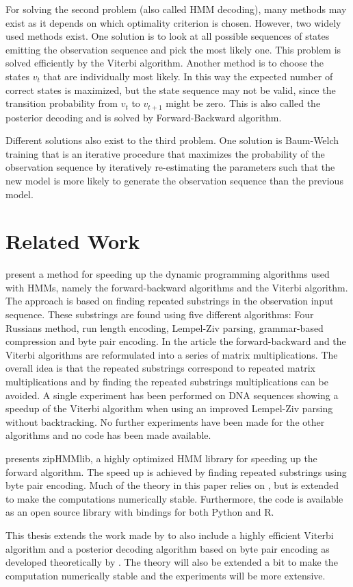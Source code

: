 For solving the second problem (also called HMM decoding), many
methods may exist as it depends on which optimality criterion is chosen.
However, two widely used methods exist. One solution is to look at all possible
sequences of states emitting the observation sequence and pick the most likely
one. This problem is solved efficiently by the Viterbi algorithm. Another
method is to choose the states $v_t$ that are individually most likely. In this
way the expected number of correct states is maximized, but the state sequence
may not be valid, since the transition probability from $v_t$ to $v_{t + 1}$
might be zero. This is also called the posterior decoding and is solved by
Forward-Backward algorithm.

Different solutions also exist to the third problem. One solution is Baum-Welch
training that is an iterative procedure that maximizes the probability of the
observation sequence by iteratively re-estimating the parameters such that the
new model is more likely to generate the observation sequence than the previous
model.

\section{Related Work}

\citet{lifshits2009speeding} present a method for speeding up the dynamic
programming algorithms used with HMMs, namely the forward-backward algorithms
and the Viterbi algorithm. The approach is based on finding repeated substrings
in the observation input sequence. These substrings are found using five
different algorithms: Four Russians method, run length encoding, Lempel-Ziv
parsing, grammar-based compression and byte pair encoding. In the article the
forward-backward and the Viterbi algorithms are reformulated into a series of
matrix multiplications. The overall idea is that the repeated substrings
correspond to repeated matrix multiplications and by finding the repeated
substrings multiplications can be avoided. A single experiment has been
performed on DNA sequences showing a speedup of the Viterbi algorithm when
using an improved Lempel-Ziv parsing without backtracking. No further
experiments have been made for the other algorithms and no code has been made
available.

\citet{sand2013ziphmmlib} presents zipHMMlib, a highly optimized HMM library for
speeding up the forward algorithm. The speed up is achieved by finding repeated
substrings using byte pair encoding. Much of the theory in this paper relies on
\cite{lifshits2009speeding}, but is extended to make the computations
numerically stable. Furthermore, the code is available as an open source
library with bindings for both Python and R.

This thesis extends the work made by \citet{sand2013ziphmmlib} to also include
a highly efficient Viterbi algorithm and a posterior decoding algorithm based
on byte pair encoding as developed theoretically by
\citet{lifshits2009speeding}. The theory will also be extended a bit to make
the computation numerically stable and the experiments will be more extensive.

